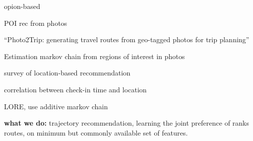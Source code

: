\cite{Zhang2015OOP} opion-based

POI rec from photos~\cite{shi2011personalized}

``Photo2Trip: generating travel routes from geo-tagged photos for trip planning''~\cite{lu2010photo2trip}

Estimation markov chain from regions of interest in photos~\cite{zheng2012patterns}

survey of location-based recommendation~\cite{bao2015recommendations}

correlation between check-in time and location~\cite{gao2013temporal}

LORE, use additive markov chain\cite{zhang2014lore}

{\bf what we do:}
trajectory recommendation, learning the joint preference of ranks routes, on minimum but commonly available set of features. 


